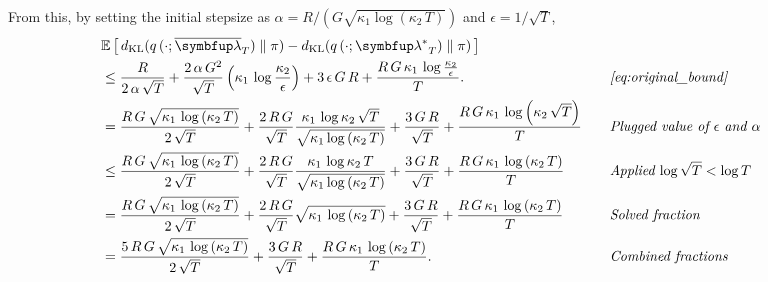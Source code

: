 \begin{proofEnd}
  From this, by setting the initial stepsize as \(\alpha = R / \left(G \sqrt{\kappa_1 \log \left(\kappa_2 \, T\right) }\right)\) and \(\epsilon = 1/ \sqrt{T}\),
  \begin{alignat*}{2}
    &\E{ \DKL{q\,(\cdot; {\overline{\vlambda}_{T}})}{\pi} - \DKL{q\left(\cdot; {\vlambda^*}_{T}\right)}{\pi}}
    \\
    &\leq
    \frac{R}{2 \, \alpha \, \sqrt{T}}
    +
    \frac{2 \, \alpha \, G^2}{\sqrt{T}}\left( \kappa_1 \, \log \frac{\kappa_2}{\epsilon} \right)
    +
    3 \, \epsilon \, G \, R
    +
    \frac{R \, G \, \kappa_1 \, \log \frac{\kappa_2}{\epsilon}}{T}.
    &&\quad\text{\textit{\cref{eq:original_bound}}}
    \\
    &=
    \frac{R \, G \, \sqrt{\kappa_1 \, \log \left(\kappa_2 \, T\right) } }{2 \, \sqrt{T}}
    +
    \frac{2 \, R \, G}{\sqrt{T}}
    \frac{ \kappa_1 \, \log \kappa_2 \, \sqrt{T} }{ \sqrt{\kappa_1 \log \left(\kappa_2 \, T\right)}}
    +
    \frac{3 \, G \, R}{\sqrt{T}}
    +
    \frac{R \, G \, \kappa_1 \, \log \left(\kappa_2 \, \sqrt{T}\right)}{T}
    &&\quad\text{\textit{Plugged value of \(\epsilon\) and \(\alpha\)}}
    \\
    &\leq
    \frac{R \, G \, \sqrt{\kappa_1 \, \log \left(\kappa_2 \, T\right) } }{2 \, \sqrt{T}}
    +
    \frac{2 \, R \, G}{\sqrt{T}}
    \frac{ \kappa_1 \, \log \kappa_2 \, T }{ \sqrt{\kappa_1 \log \left(\kappa_2 \, T\right)}}
    +
    \frac{3 \, G \, R}{\sqrt{T}}
    +
    \frac{R \, G \, \kappa_1 \, \log \left(\kappa_2 \, T\right)}{T}
    &&\quad\text{\textit{Applied \(\log \sqrt{T} < \log T\)}}
    \\
    &=
    \frac{R \, G \, \sqrt{\kappa_1 \, \log \left(\kappa_2 \, T\right) } }{2 \, \sqrt{T}}
    +
    \frac{2 \, R \, G}{\sqrt{T}}
    \sqrt{\kappa_1 \, \log \left( \kappa_2 \, T\right) }
    +
    \frac{3 \, G \, R}{\sqrt{T}}
    +
    \frac{R \, G \, \kappa_1 \, \log \left(\kappa_2 \, T\right)}{T}
    &&\quad\text{\textit{Solved fraction}}
    \\
    &=
    \frac{5 \, R \, G \, \sqrt{\kappa_1 \, \log \left(\kappa_2 \, T\right) } }{2 \, \sqrt{T}}
    +
    \frac{3 \, G \, R}{\sqrt{T}}
    +
    \frac{R \, G \, \kappa_1 \, \log \left(\kappa_2 \, T\right)}{T}.
    &&\quad\text{\textit{Combined fractions}}
  \end{alignat*}


\end{proofEnd}
